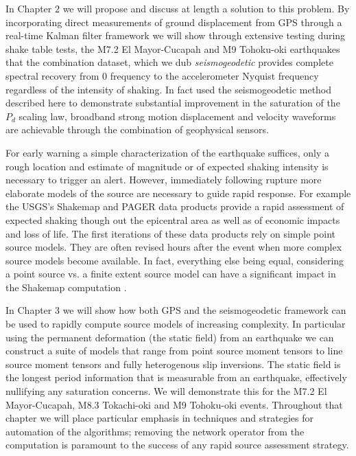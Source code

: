 In Chapter 2 we will propose and discuss at length a solution to this problem. By incorporating direct measurements of ground displacement from GPS through a real-time Kalman filter framework we will show through extensive testing during shake table tests, the M7.2 El Mayor-Cucapah and M9 Tohoku-oki earthquakes that the combination dataset, which we dub \textit{seismogeodetic} provides complete spectral recovery from 0 frequency to the accelerometer Nyquist frequency regardless of the intensity of shaking. In fact \citep{Crowell2013} used the seismogeodetic method described here to demonstrate substantial improvement in the saturation of the $P_d$ scaling law, broadband strong motion displacement and velocity waveforms are achievable through the combination of geophysical sensors.

For early warning a simple characterization of the earthquake suffices, only a rough location and estimate of magnitude or of expected shaking intensity is necessary to trigger an alert. However, immediately following rupture more elaborate models of the source are necessary to guide rapid response. For example the USGS's Shakemap \citep{allen2009shake} and PAGER \citep{jaiswal2010} data products provide a rapid assessment of expected shaking though out the epicentral area as well as of economic impacts and loss of life. The first iterations of these data products rely on simple point source models. They are often revised hours after the event when more complex source models become available. In fact, everything else being equal, considering a point source vs. a finite extent source model can have a significant impact in the Shakemap computation \citep{colombelli2013}.

In Chapter 3 we will show how both GPS and the seismogeodetic framework can be used to rapidly compute source models of increasing complexity. In particular using the permanent deformation (the static field) from an earthquake we can construct a suite of models that range from point source moment tensors to line source moment tensors and fully heterogenous slip inversions. The static field is the longest period information that is measurable from an earthquake, effectively nullifying any saturation concerns.  We will demonstrate this for the M7.2 El Mayor-Cucapah, M8.3 Tokachi-oki and M9 Tohoku-oki events. Throughout that chapter we will place particular emphasis in techniques and strategies for automation of the algorithms; removing the network operator from the computation is paramount to the success of any rapid source assessment strategy.

